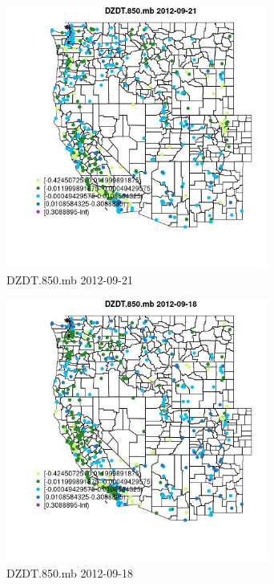 \begin{figure} 
\centering  
\includegraphics[width=0.77\textwidth]{Code_Outputs/Report_ML_input_PM25_Step4_part_e_de_duplicated_aves_compiled_2019-05-14wNAs_MapObsDZDT850mb2012-09-21.jpg} 
\caption{\label{fig:Report_ML_input_PM25_Step4_part_e_de_duplicated_aves_compiled_2019-05-14wNAsMapObsDZDT850mb2012-09-21}DZDT.850.mb 2012-09-21} 
\end{figure} 
 

\begin{figure} 
\centering  
\includegraphics[width=0.77\textwidth]{Code_Outputs/Report_ML_input_PM25_Step4_part_e_de_duplicated_aves_compiled_2019-05-14wNAs_MapObsDZDT850mb2012-09-18.jpg} 
\caption{\label{fig:Report_ML_input_PM25_Step4_part_e_de_duplicated_aves_compiled_2019-05-14wNAsMapObsDZDT850mb2012-09-18}DZDT.850.mb 2012-09-18} 
\end{figure} 
 


